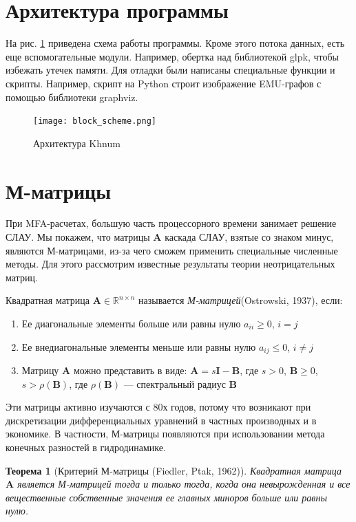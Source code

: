 \documentclass[14pt, a4paper]{extreport}
\begin{document}
\clearpage
\section{Архитектура программы}

На рис. \ref{architecture} приведена схема работы программы. Кроме этого потока данных, есть еще вспомогательные модули. Например, обертка над библиотекой glpk, чтобы избежать утечек памяти. Для отладки были написаны специальные функции и скрипты. Например, скрипт на Python строит изображение EMU-графов с помощью библиотеки graphviz.

\begin{figure}
	\texttt{[image: block\_scheme.png]}
	\caption{Архитектура Khnum}
	\label{architecture}
\end{figure}
\clearpage

\section{М-матрицы}
При MFA-расчетах, большую часть процессорного времени занимает решение СЛАУ. Мы покажем, что матрицы $\mathbf{A}$ каскада СЛАУ, взятые со знаком минус, являются М-матрицами, из-за чего сможем применить специальные численные методы. Для этого рассмотрим известные результаты теории неотрицательных матриц.

Квадратная матрица $\mathbf{A} \in \mathbb{R}^{n \times n}$ называется \emph{М-матрицей}(Ostrowski, 1937)\cite{m_matrix_orig}, если:
\begin{enumerate}
	\item Ее диагональные элементы больше или равны нулю $a_{ii} \ge 0$, $i = j$
	\item Ее внедиагональные элементы меньше или равны нулю $a_{ij} \le 0$, $i \neq j$
	\item Матрицу $\mathbf{A}$ можно представить в виде: $\mathbf{A} = s\mathbf{I} - \mathbf{B}$, где $s > 0$, $\mathbf{B} \ge 0$, $s > \rho(\mathbf{B})$, где $\rho(\mathbf{B})$ --- спектральный радиус $\mathbf{B}$
\end{enumerate}
Эти матрицы активно изучаются с 80х годов, потому что возникают при дискретизации дифференциальных уравнений в частных производных и в экономике. В частности, М-матрицы появляются при использовании метода конечных разностей в гидродинамике\cite{m_matrix_application_1, m_matrix_application_2,m_matrix_application_3,m_matrix_application_4}.

\newtheorem{theorem}{Теорема}
\begin{theorem}[Критерий М-матрицы (Fiedler, Ptak, 1962)\cite{m_matrix_def}]
	\label{m_matrix_criterion}
	Квадратная матрица $\mathbf{A}$ является М-матрицей тогда и только тогда, когда она невырожденная и все вещественные собственные значения ее главных миноров больше или равны нулю. 	
\end{theorem}
\end{document}
